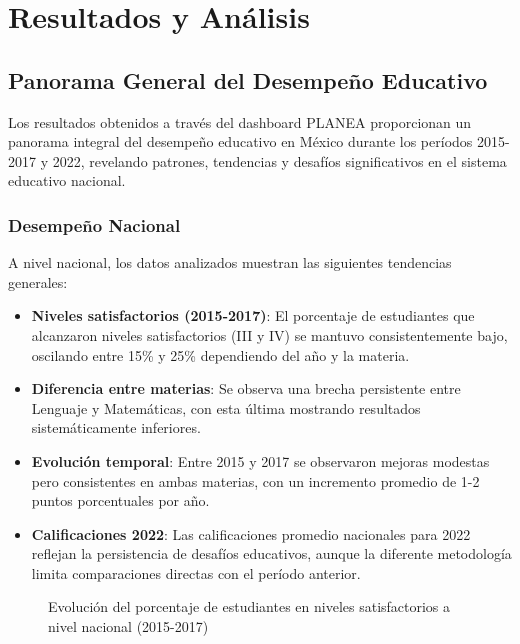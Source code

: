 \chapter{Resultados y Análisis}

\section{Panorama General del Desempeño Educativo}
Los resultados obtenidos a través del dashboard PLANEA proporcionan un panorama integral del desempeño educativo en México durante los períodos 2015-2017 y 2022, revelando patrones, tendencias y desafíos significativos en el sistema educativo nacional.

\subsection{Desempeño Nacional}
A nivel nacional, los datos analizados muestran las siguientes tendencias generales:

\begin{itemize}
    \item \textbf{Niveles satisfactorios (2015-2017)}: El porcentaje de estudiantes que alcanzaron niveles satisfactorios (III y IV) se mantuvo consistentemente bajo, oscilando entre 15\% y 25\% dependiendo del año y la materia.
    
    \item \textbf{Diferencia entre materias}: Se observa una brecha persistente entre Lenguaje y Matemáticas, con esta última mostrando resultados sistemáticamente inferiores.
    
    \item \textbf{Evolución temporal}: Entre 2015 y 2017 se observaron mejoras modestas pero consistentes en ambas materias, con un incremento promedio de 1-2 puntos porcentuales por año.
    
    \item \textbf{Calificaciones 2022}: Las calificaciones promedio nacionales para 2022 reflejan la persistencia de desafíos educativos, aunque la diferente metodología limita comparaciones directas con el período anterior.
\end{itemize}

\begin{figure}[h]
    \centering
    \caption{Evolución del porcentaje de estudiantes en niveles satisfactorios a nivel nacional (2015-2017)}
    \label{fig:tendencia_nacional}
\end{figure}


